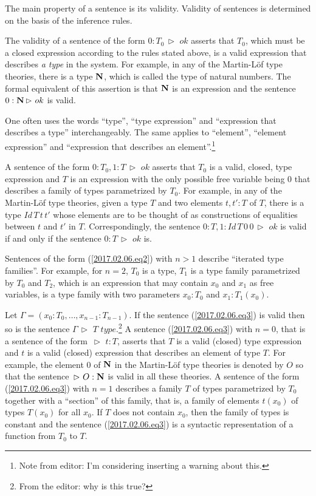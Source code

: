 \documentclass[12pt]{amsart}
\newcommand{\nn}{{\bf N\rm}}
\newcommand{\nat}{\nn}
\newcommand{\rh}{{\,\rhd\,\,}}
\newcommand{\type}{\,\,type}
\begin{document}
The main property of a sentence is its validity. Validity of sentences is
determined on the basis of the inference rules.

The validity of a sentence of the form $0:T_0\rh ok$ asserts that $T_0$, which
must be a closed expression according to the rules stated above, is a valid
expression that describes {\em a type} in the system. For example, in any of
the Martin-L\"{o}f type theories, there is a type $\nat$, which is called the
type of natural numbers. The formal equivalent of this assertion is that $\nat$
is an expression and the sentence $0:\nat\rh ok$ is valid.

One often uses the words ``type'', ``type expression'' and ``expression that
describes a type'' interchangeably. The same applies to ``element'', ``element
expression'' and ``expression that describes an element''.\footnote{Note from
  editor: I'm considering inserting a warning about this.}

A sentence of the form $0:T_0,1:T\rh ok$ asserts that $T_0$ is a valid, closed,
type expression and $T$ is an expression with the only possible free variable
being $0$ that describes {a family of types} parametrized by $T_0$. For
example, in any of the Martin-L\"{o}f type theories, given a type $T$ and two
elements $t,t':T$ of $T$, there is a type $Id\,T\,t\,t'$ whose elements are to
be thought of as constructions of equalities between $t$ and $t'$ in
$T$. Correspondingly, the sentence $0:T, 1:Id\,T\,0\,0\rh ok$ is valid if and
only if the sentence $0:T\rh ok$ is.

Sentences of the form (\ref{2017.02.06.eq2}) with $n>1$ describe ``iterated
type families''. For example, for $n=2$, $T_0$ is a type, $T_1$ is a type
family parametrized by $T_0$ and $T_2$, which is an expression that may contain
$x_0$ and $x_1$ as free variables, is a type family with two parameters
$x_0:T_0$ and $x_1:T_1(x_0)$.

Let $\Gamma=(x_0:T_0,\dots,x_{n-1}:T_{n-1})$. If the sentence
(\ref{2017.02.06.eq3}) is valid then so is the sentence $\Gamma\rh T\type$.\footnote{From the editor: why is this true?}  A
sentence (\ref{2017.02.06.eq3}) with $n=0$, that is a sentence of the form $\rh
t:T$, asserts that $T$ is a valid (closed) type expression and $t$ is a valid
(closed) expression that describes an element of type $T$. For example, the
element $0$ of $\nat$ in the Martin-L\"{o}f type theories is denoted by $O$ so
that the sentence $\rh O:\nat$ is valid in all these theories. A sentence of
the form (\ref{2017.02.06.eq3}) with $n=1$ describes a family $T$ of types
parametrized by $T_0$ together with a ``section'' of this family, that is, a
family of elements $t(x_0)$ of types $T(x_0)$ for all $x_0$. If $T$ does not
contain $x_0$, then the family of types is constant and the sentence
(\ref{2017.02.06.eq3}) is a syntactic representation of a function from $T_0$
to $T$.
\end{document}
